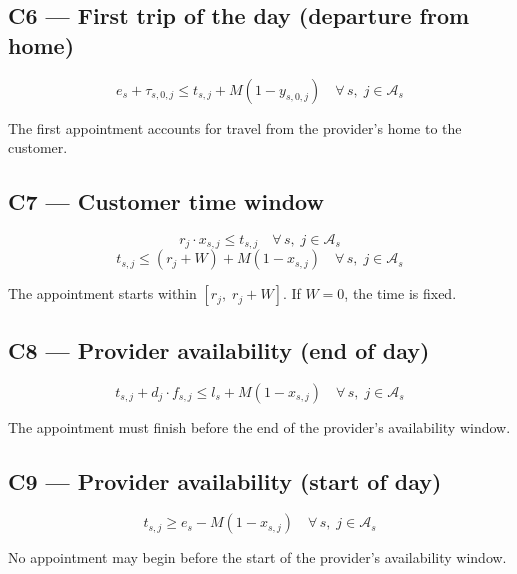 \documentclass[11pt,a4paper]{article}
\begin{document}
\subsection{C6 --- First trip of the day (departure from home)}

\begin{equation}
e_s + \tau_{s,0,j} \leq t_{s,j} + M(1 - y_{s,0,j}) \quad \forall\, s,\; j \in \mathcal{A}_s
\end{equation}

The first appointment accounts for travel from the provider's home to the customer.

\subsection{C7 --- Customer time window}

\begin{equation}
r_j \cdot x_{s,j} \leq t_{s,j} \quad \forall\, s,\; j \in \mathcal{A}_s
\end{equation}
\begin{equation}
t_{s,j} \leq (r_j + W) + M(1 - x_{s,j}) \quad \forall\, s,\; j \in \mathcal{A}_s
\end{equation}

The appointment starts within $[r_j,\; r_j + W]$. If $W = 0$, the time is fixed.

\subsection{C8 --- Provider availability (end of day)}

\begin{equation}
t_{s,j} + d_j \cdot f_{s,j} \leq l_s + M(1 - x_{s,j}) \quad \forall\, s,\; j \in \mathcal{A}_s
\end{equation}

The appointment must finish before the end of the provider's availability window.

\subsection{C9 --- Provider availability (start of day)}

\begin{equation}
t_{s,j} \geq e_s - M(1 - x_{s,j}) \quad \forall\, s,\; j \in \mathcal{A}_s
\end{equation}

No appointment may begin before the start of the provider's availability window.
\end{document}
